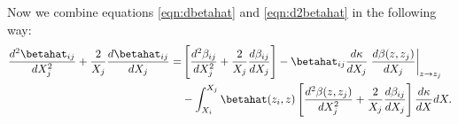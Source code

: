 Now we combine equations \ref{eqn:dbetahat} and \ref{eqn:d2betahat} in the following way:
\begin{eqnarray}
\frac{d^2 \betahat_{i j}}{d X_j^2} + \frac{2}{X_j} \frac{d \betahat_{i j}}{d X_j} = & \left[\frac{d^2 \beta_{i j}}{d X_j^2}  + \frac{2}{X_j} \frac{d \beta_{i j}}{d X_j}\right] -  \betahat_{i j} \frac{d \kappa}{d X_j} \left. \frac{d \beta(z, z_j)}{d X_j}  \right|_{z \rightarrow z_j} \nonumber \\ 
\label{eqn:betahatcombine} 
&- \int_{X_i}^{X_j} \betahat(z_i, z)\left[ \frac{d^2 \beta(z, z_j)}{d X_j^2}  + \frac{2}{X_j} \frac{d \beta_{i j}}{dX_j}\right] \frac{d \kappa}{d X} d X.
\end{eqnarray}
  
  
  
  
  
  
  
  
  
  